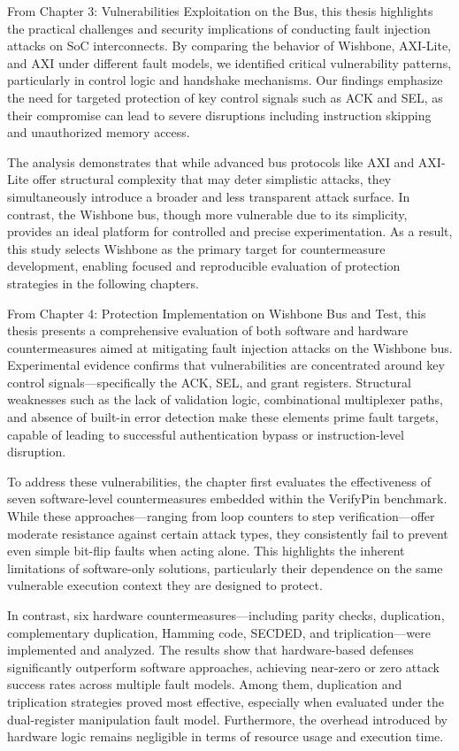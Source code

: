 From Chapter 3: Vulnerabilities Exploitation on the Bus, this thesis highlights the practical challenges and security implications of conducting fault injection attacks on SoC interconnects. By comparing the behavior of Wishbone, AXI-Lite, and AXI under different fault models, we identified critical vulnerability patterns, particularly in control logic and handshake mechanisms. Our findings emphasize the need for targeted protection of key control signals such as ACK and SEL, as their compromise can lead to severe disruptions including instruction skipping and unauthorized memory access.

The analysis demonstrates that while advanced bus protocols like AXI and AXI-Lite offer structural complexity that may deter simplistic attacks, they simultaneously introduce a broader and less transparent attack surface. In contrast, the Wishbone bus, though more vulnerable due to its simplicity, provides an ideal platform for controlled and precise experimentation. As a result, this study selects Wishbone as the primary target for countermeasure development, enabling focused and reproducible evaluation of protection strategies in the following chapters.

From Chapter 4: Protection Implementation on Wishbone Bus and Test, this thesis presents a comprehensive evaluation of both software and hardware countermeasures aimed at mitigating fault injection attacks on the Wishbone bus. Experimental evidence confirms that vulnerabilities are concentrated around key control signals—specifically the ACK, SEL, and grant registers. Structural weaknesses such as the lack of validation logic, combinational multiplexer paths, and absence of built-in error detection make these elements prime fault targets, capable of leading to successful authentication bypass or instruction-level disruption.

To address these vulnerabilities, the chapter first evaluates the effectiveness of seven software-level countermeasures embedded within the VerifyPin benchmark. While these approaches—ranging from loop counters to step verification—offer moderate resistance against certain attack types, they consistently fail to prevent even simple bit-flip faults when acting alone. This highlights the inherent limitations of software-only solutions, particularly their dependence on the same vulnerable execution context they are designed to protect.

In contrast, six hardware countermeasures—including parity checks, duplication, complementary duplication, Hamming code, SECDED, and triplication—were implemented and analyzed. The results show that hardware-based defenses significantly outperform software approaches, achieving near-zero or zero attack success rates across multiple fault models. Among them, duplication and triplication strategies proved most effective, especially when evaluated under the dual-register manipulation fault model. Furthermore, the overhead introduced by hardware logic remains negligible in terms of resource usage and execution time.

